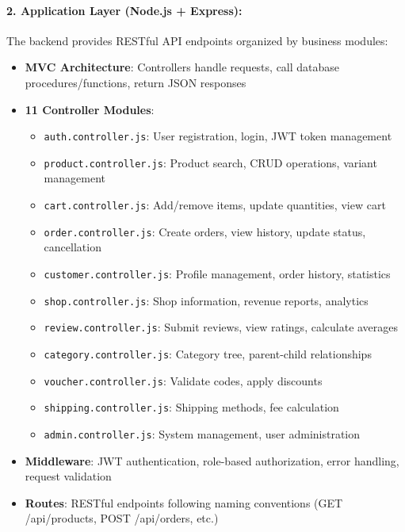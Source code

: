 \paragraph{2. Application Layer (Node.js + Express):}

The backend provides RESTful API endpoints organized by business modules:

\begin{itemize}
    \item \textbf{MVC Architecture}: Controllers handle requests, call database procedures/functions, return JSON responses
    \item \textbf{11 Controller Modules}:
    \begin{itemize}
        \item \texttt{auth.controller.js}: User registration, login, JWT token management
        \item \texttt{product.controller.js}: Product search, CRUD operations, variant management
        \item \texttt{cart.controller.js}: Add/remove items, update quantities, view cart
        \item \texttt{order.controller.js}: Create orders, view history, update status, cancellation
        \item \texttt{customer.controller.js}: Profile management, order history, statistics
        \item \texttt{shop.controller.js}: Shop information, revenue reports, analytics
        \item \texttt{review.controller.js}: Submit reviews, view ratings, calculate averages
        \item \texttt{category.controller.js}: Category tree, parent-child relationships
        \item \texttt{voucher.controller.js}: Validate codes, apply discounts
        \item \texttt{shipping.controller.js}: Shipping methods, fee calculation
        \item \texttt{admin.controller.js}: System management, user administration
    \end{itemize}
    \item \textbf{Middleware}: JWT authentication, role-based authorization, error handling, request validation
    \item \textbf{Routes}: RESTful endpoints following naming conventions (GET /api/products, POST /api/orders, etc.)
\end{itemize}

